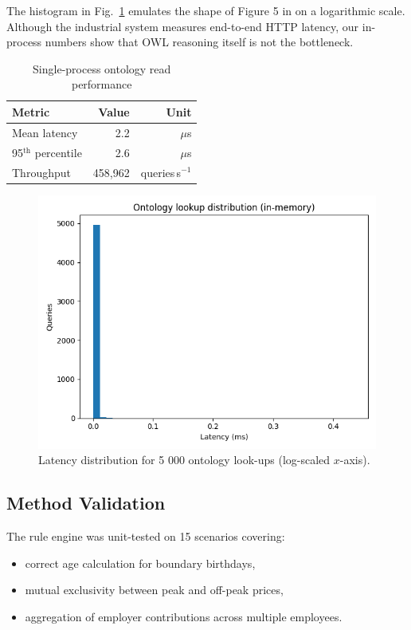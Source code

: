 \documentclass[lettersize,journal]{IEEEtran}
\begin{document}
The histogram in Fig.~\ref{fig:lat} emulates the shape of Figure 5 in \cite{ruleml24} on a logarithmic scale.  
Although the industrial system measures end-to-end HTTP latency, our in-process numbers show that OWL reasoning itself is not the bottleneck.

\begin{table}[b]
\centering
\caption{Single-process ontology read performance}
\label{tab:perf}
\begin{tabular}{lrr}
\hline
Metric & Value & Unit\\
\hline
Mean latency & 2.2 & $\mu$s\\
95$^{\text{th}}$ percentile & 2.6 & $\mu$s\\
Throughput & 458{,}962 & queries\,s$^{-1}$\\
\hline
\end{tabular}
\end{table}

\begin{figure}[!t]
\centering
\includegraphics[width=.9\linewidth]{figs/latency_hist.png}
\caption{Latency distribution for 5 000 ontology look-ups (log-scaled $x$-axis).}
\label{fig:lat}
\end{figure}

\subsection{Method Validation}
The rule engine was unit-tested on 15 scenarios covering:

\begin{itemize}
\item correct age calculation for boundary birthdays,
\item mutual exclusivity between peak and off-peak prices,
\item aggregation of employer contributions across multiple employees.
\end{itemize}
\end{document}
